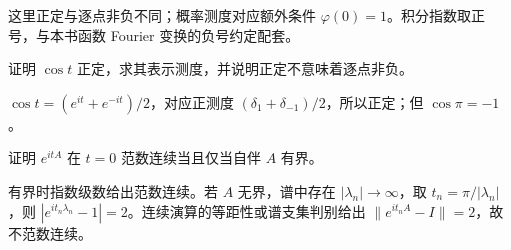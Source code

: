 这里正定与逐点非负不同；概率测度对应额外条件 $\varphi(0)=1$。积分指数取正号，与本书函数 Fourier 变换的负号约定配套。

\begin{exercise}[含负值的正定函数]\label{ex:y11-positive-definite}
证明 $\cos t$ 正定，求其表示测度，并说明正定不意味着逐点非负。
\end{exercise}
\begin{solution}
$\cos t=(e^{it}+e^{-it})/2$，对应正测度 $(\delta_1+\delta_{-1})/2$，所以正定；但 $\cos\pi=-1$。
\end{solution}

\begin{exercise}[有界生成元与范数连续]\label{ex:y11-unitary-norm-continuity}
证明 $e^{itA}$ 在 $t=0$ 范数连续当且仅当自伴 $A$ 有界。
\end{exercise}
\begin{solution}
有界时指数级数给出范数连续。若 $A$ 无界，谱中存在 $|\lambda_n|\to\infty$，取 $t_n=\pi/|\lambda_n|$，则 $|e^{it_n\lambda_n}-1|=2$。连续演算的等距性或谱支集判别给出 $\|e^{it_nA}-I\|=2$，故不范数连续。
\end{solution}
